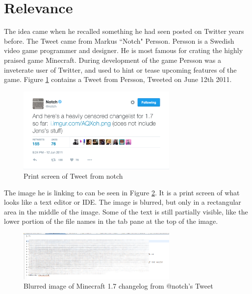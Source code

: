 
\section{Relevance}
The idea came when he recalled something he had seen posted on Twitter years before. The Tweet came from Markus ``Notch" Persson. Persson is a Swedish video game programmer and designer. He is most famous for crating the highly praised game Minecraft. During development of the game Persson was a inveterate user of Twitter, and used to hint or tease upcoming features of the game. Figure \ref{ref:notch_twitter} contains a Tweet from Persson, Tweeted on June 12th 2011.

\begin{figure}[ht]
    \centering
    \includegraphics[width=0.7\textwidth]{fig/chapter1/notch_tweet.png}
    \caption[Print screen of Tweet from notch]{Print screen of Tweet from notch\protect\footnotemark}
    \label{ref:notch_twitter}
\end{figure}

The image he is linking to can be seen in Figure \ref{fig:notch_imgur}. It is a print screen of what looks like a text editor or \gls{IDE}. The image is blurred, but only in a rectangular area in the middle of the image. Some of the text is still partially visible, like the lower portion of the file names in the tab pane at the top of the image. 

\begin{figure}[ht]
    \centering
    \includegraphics[width=0.7\textwidth]{fig/chapter1/notch_eclipse.png}
    \caption{Blurred image of Minecraft 1.7 changelog from @notch's Tweet}
    \label{fig:notch_imgur}
\end{figure}

